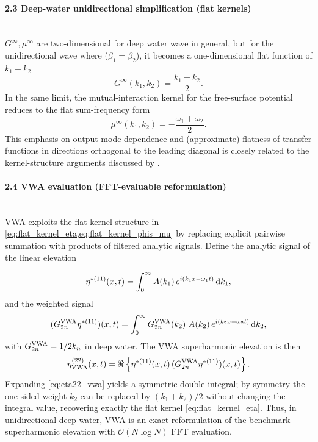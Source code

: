 \documentclass[11pt,letter]{article}
\begin{document}
\paragraph{2.3 Deep-water unidirectional simplification (flat kernels)}$\quad$\\
$G^{\infty},\mu^{\infty}$ are two-dimensional for deep water wave in general, but for the unidirectional wave where ($\beta_1=\beta_2$), it becomes a one-dimensional flat function of $k_1+k_2$
\begin{equation}\label{eq:flat_kernel_eta}
G^\infty(k_1,k_2)=\frac{k_1+k_2}{2}.
\end{equation}
In the same limit, the mutual-interaction kernel for the free-surface potential reduces to the flat sum-frequency form \cite{madsen_third-order_2012}
\begin{equation}\label{eq:flat_kernel_phis_mu}
\mu^\infty(k_1,k_2)=-\frac{\omega_1+\omega_2}{2}.
\end{equation}
This emphasis on output-mode dependence and (approximate) flatness of transfer functions in directions orthogonal to the leading diagonal is closely related to the kernel-structure arguments discussed by \cite{zhao_gap_2021}.




\paragraph{2.4 VWA evaluation (FFT-evaluable reformulation)}$\quad$\\
VWA exploits the flat-kernel structure in \cref{eq:flat_kernel_eta,eq:flat_kernel_phis_mu} by replacing explicit pairwise summation with products of filtered analytic signals. Define the analytic signal of the linear elevation

\begin{equation}\label{eq:eta_star}
\eta^{*(11)}(x,t)=\int_{0}^{\infty}A(k_1)\,e^{i(k_1x-\omega_1 t)}\,{\rm d}k_1,
\end{equation}
and the weighted signal
\begin{equation}\label{eq:k_eta_star}
(G_{2n}^{\rm VWA}\eta^{*(11)})(x,t)=\int_{0}^{\infty}G_{2n}^{\rm VWA}(k_2)\,\,A(k_2)\,e^{i(k_2x-\omega_2 t)}\,{\rm d}k_2,
\end{equation}
with $G_{2n}^{\rm VWA}=1/2k_n$ in deep water. The VWA superharmonic elevation is then
\begin{equation}\label{eq:eta22_vwa}
\eta_{\rm VWA}^{(22)}(x,t)=\Re\left\{\eta^{*(11)}(x,t)\,(G_{2n}^{\rm VWA}\eta^{*(11)})(x,t)\right\}.
\end{equation}
Expanding \cref{eq:eta22_vwa} yields a symmetric double integral; by symmetry the one-sided weight $k_2$ can be replaced by $(k_1+k_2)/2$ without changing the integral value, recovering exactly the flat kernel \cref{eq:flat_kernel_eta}. Thus, in unidirectional deep water, VWA is an exact reformulation of the benchmark superharmonic elevation with $\mathcal{O}(N\log N)$ FFT evaluation.
\end{document}
